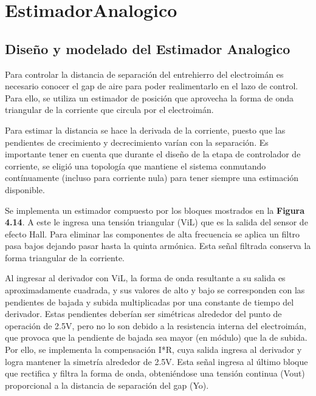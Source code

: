 \chapter{EstimadorAnalogico}  \label{cap:Estimador Analogico}

\section{Diseño y modelado del Estimador Analogico}

Para controlar la distancia de separaci\'{o}n del entrehierro del electroim\'{a}n es necesario conocer el gap de aire para poder realimentarlo en el lazo de control.  Para ello, se utiliza un estimador de posici\'{o}n que aprovecha la forma de onda triangular de la corriente que circula por el electroim\'{a}n. 



\noindent Para estimar la distancia se hace la derivada de la corriente, puesto que las pendientes de crecimiento y decrecimiento var\'{i}an con la separaci\'{o}n. Es importante tener en cuenta que durante el dise\~{n}o de la etapa de controlador de corriente, se eligi\'{o} una topolog\'{i}a que mantiene el sistema conmutando cont\'{i}nuamente (incluso para corriente nula) para tener siempre una estimaci\'{o}n disponible.



\noindent Se implementa un estimador compuesto por los bloques mostrados en la \textbf{Figura 4.14}. A este le ingresa una tensi\'{o}n triangular (ViL) que es la salida del sensor de efecto Hall. Para eliminar las componentes de alta frecuencia se aplica un filtro pasa bajos dejando pasar hasta la quinta arm\'{o}nica. Esta se\~{n}al filtrada conserva la forma triangular de la corriente. 



\noindent Al ingresar al derivador con ViL, la forma de onda resultante a su salida es aproximadamente cuadrada, y sus valores de alto y bajo se corresponden con las pendientes de bajada y subida multiplicadas por una constante de tiempo del derivador. Estas pendientes deber\'{i}an ser sim\'{e}tricas alrededor del punto de operaci\'{o}n de 2.5V, pero no lo son debido a la resistencia interna del electroim\'{a}n, que provoca que la pendiente de bajada sea mayor (en m\'{o}dulo) que la de subida. Por ello, se implementa la compensaci\'{o}n I*R, cuya salida ingresa al derivador y logra mantener la simetr\'{i}a alrededor de 2.5V. Esta se\~{n}al ingresa al \'{u}ltimo bloque que rectifica y filtra la forma de onda, obteni\'{e}ndose una tensi\'{o}n continua (Vout) proporcional a la distancia de separaci\'{o}n del gap (Yo).


